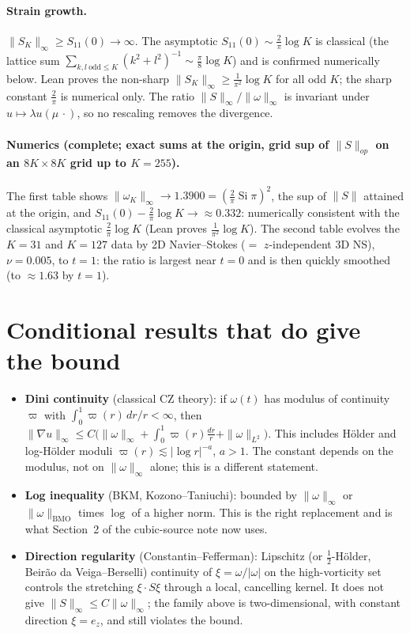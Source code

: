\documentclass[11pt]{article}
\theoremstyle{definition}\newtheorem{definition}{Definition}
\begin{document}
\paragraph{Strain growth.} $\|S_K\|_\infty\ge S_{11}(0)\to\infty$. The asymptotic $S_{11}(0)\sim\tfrac2\pi\log K$ is classical (the lattice sum $\sum_{k,l\ \mathrm{odd}\le K}(k^2+l^2)^{-1}\sim\tfrac\pi8\log K$) and is confirmed numerically below. Lean proves the non-sharp $\|S_K\|_\infty\ge\tfrac1{\pi^2}\log K$ for all odd $K$; the sharp constant $\tfrac2\pi$ is numerical only.
The ratio $\|S\|_\infty/\|\omega\|_\infty$ is invariant under $u\mapsto\lambda u(\mu\,\cdot)$, so no rescaling removes the divergence.

\paragraph{Numerics (complete; exact sums at the origin, grid sup of $\|S\|_{op}$ on an $8K\times8K$ grid up to $K=255$).}

The first table shows $\|\omega_K\|_\infty\to1.3900=(\tfrac2\pi\operatorname{Si}\pi)^2$, the sup of $\|S\|$ attained at the origin, and $S_{11}(0)-\tfrac2\pi\log K\to\approx0.332$: numerically consistent with the classical asymptotic $\tfrac2\pi\log K$ (Lean proves $\tfrac1{\pi^2}\log K$). The second table evolves the $K=31$ and $K=127$ data by 2D Navier--Stokes ($=$ $z$-independent 3D NS), $\nu=0.005$, to $t=1$: the ratio is largest near $t=0$ and is then quickly smoothed (to $\approx1.63$ by $t=1$).

\section{Conditional results that do give the bound}
\begin{itemize}
\item \textbf{Dini continuity} (classical CZ theory): if $\omega(t)$ has modulus of continuity $\varpi$ with $\int_0^1\varpi(r)\,dr/r<\infty$, then $\|\nabla u\|_\infty\le C\bigl(\|\omega\|_\infty+\int_0^1\varpi(r)\frac{dr}r+\|\omega\|_{L^2}\bigr)$. This includes H\"older and log-H\"older moduli $\varpi(r)\lesssim|\log r|^{-a}$, $a>1$. The constant depends on the modulus, not on $\|\omega\|_\infty$ alone; this is a different statement.
\item \textbf{Log inequality} (BKM, Kozono--Taniuchi): bounded by $\|\omega\|_\infty$ or $\|\omega\|_{\mathrm{BMO}}$ times $\log$ of a higher norm. This is the right replacement and is what Section~2 of the cubic-source note now uses.
\item \textbf{Direction regularity} (Constantin--Fefferman): Lipschitz (or $\tfrac12$-H\"older, Beir\~ao da Veiga--Berselli) continuity of $\xi=\omega/|\omega|$ on the high-vorticity set controls the stretching $\xi\cdot S\xi$ through a local, cancelling kernel. It does not give $\|S\|_\infty\le C\|\omega\|_\infty$; the family above is two-dimensional, with constant direction $\xi=e_z$, and still violates the bound.
\end{itemize}
\end{document}
